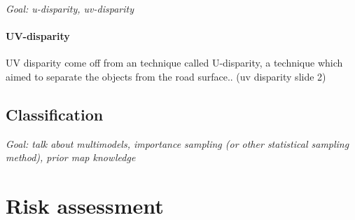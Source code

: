\textit{Goal: u-disparity, uv-disparity}

\paragraph*{UV-disparity} 

UV disparity come off from an technique called U-disparity, a technique which aimed to separate the objects from the road surface.. (uv disparity slide 2)


\subsection{Classification}

\textit{Goal: talk about multimodels, importance sampling (or other statistical sampling method), prior map knowledge }


\section{Risk assessment}


